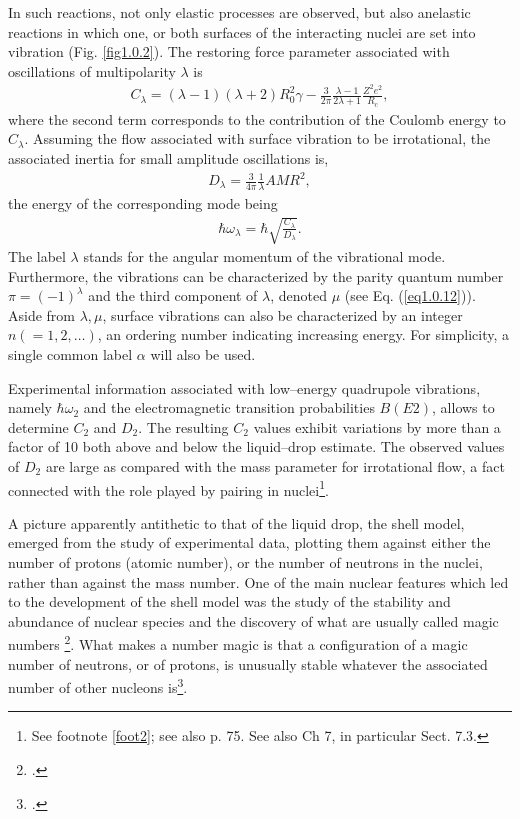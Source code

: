 In such reactions, not only elastic processes are observed, but also anelastic reactions in which one, or both  surfaces of the interacting nuclei are set into vibration (Fig. \ref{fig1.0.2}). The restoring force parameter associated with oscillations of multipolarity $\lambda$ is 
\begin{align}\label{eq1.0.4b}
C_\lambda=(\lambda-1)(\lambda+2)R_0^2\gamma-\frac{3}{2\pi}\frac{\lambda-1}{2\lambda+1}\frac{Z^2e^2}{R_c},
\end{align}
where the second term corresponds to the contribution of the Coulomb energy to $C_\lambda$. Assuming the flow associated with surface vibration to be irrotational, the associated inertia for small amplitude oscillations is, 
\begin{align}\label{eq1.0.5}
D_{\lambda}=\frac{3}{4\pi}\frac{1}{\lambda}AMR^2,
\end{align}
the energy of the corresponding mode being
\begin{align}\label{eq1.0.6}
\hbar\omega_\lambda=\hbar\sqrt{\frac{C_\lambda}{D_\lambda}}.
\end{align}
The label $\lambda$ stands for the angular momentum of the vibrational mode. Furthermore, the vibrations can be characterized by the parity quantum number $\pi=(-1)^\lambda$ and the third component of $\lambda$, denoted $\mu$  (see Eq. (\ref{eq1.0.12})). Aside from $\lambda,\mu$, surface vibrations can also be characterized by an integer $n(=1,2,\dots)$, an ordering number indicating increasing energy. For simplicity, a single common label $\alpha$ will  also be used.


Experimental information associated with low--energy quadrupole vibrations, namely $\hbar\omega_{2}$ and the electromagnetic transition probabilities $B(E2)$, allows to determine $C_2$ and $D_2$. The resulting $C_2$ values exhibit variations by more than a factor of 10 both above and below the liquid--drop estimate. The observed values of $D_2$ are large as compared with the mass parameter for irrotational flow, a fact connected with the role played by pairing in nuclei\footnote{See footnote \ref{foot2}; see also \cite{Bohr:75} p. 75. See also \cite{Brink:05} Ch 7, in particular Sect. 7.3.}.

A picture apparently antithetic to that of the liquid drop, the shell model, emerged from the study of experimental data, plotting them against either the number of protons (atomic number), or the number of neutrons in the nuclei, rather than against the mass number.
One of the main nuclear features which led to the development of the shell model was the study of the stability and abundance of nuclear species and the discovery of what are usually called magic numbers \footnote{\cite{Elsasser:33,Mayer:48,Haxel:49}.}. What makes a number magic is that a configuration of a magic number of neutrons, or of protons, is unusually stable whatever the associated number of other nucleons is\footnote{\cite{Mayer:49,Mayer:49b}.}.


